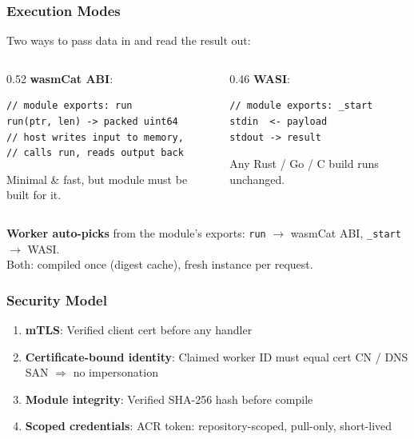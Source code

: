 \documentclass[11pt, aspectratio=169]{beamer}
\begin{document}
\begin{frame}[fragile]
	\frametitle{Execution Modes}
	Two ways to pass data in and read the result out:
	\medskip
	\begin{columns}[t]
		\begin{column}{0.52\textwidth}
			\textbf{wasmCat ABI}: 
\begin{lstlisting}
// module exports: run
run(ptr, len) -> packed uint64
// host writes input to memory,
// calls run, reads output back
\end{lstlisting}
			{\small Minimal \& fast, but module must be built for it.}
		\end{column}
		\begin{column}{0.46\textwidth}
			\textbf{WASI}: 
\begin{lstlisting}
// module exports: _start
stdin  <- payload
stdout -> result
\end{lstlisting}
			{\small Any Rust / Go / C build runs unchanged.}
		\end{column}
	\end{columns}
	\medskip

	\textbf{Worker auto-picks} from the module's exports: \texttt{run} $\to$ wasmCat ABI, \texttt{\_start} $\to$ WASI.\\
	Both: compiled once (digest cache), fresh instance per request.
\end{frame}

\begin{frame}
	\frametitle{Security Model}
	\begin{enumerate}
		\item \textbf{mTLS}: Verified client cert before any handler
		\item \textbf{Certificate-bound identity}: Claimed worker ID must equal cert CN / DNS SAN $\Rightarrow$ no impersonation
		\item \textbf{Module integrity}: Verified SHA-256 hash before compile
		\item \textbf{Scoped credentials}: ACR token: repository-scoped, pull-only, short-lived
	\end{enumerate}
\end{frame}

\end{document}
